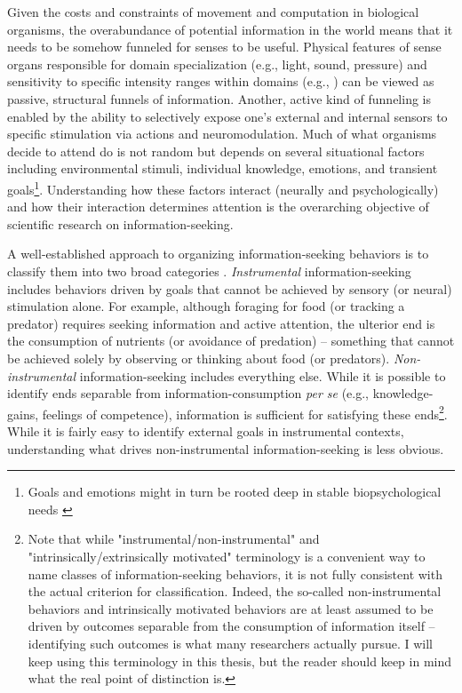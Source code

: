 Given the costs and constraints of movement and computation in biological organisms, the overabundance of potential information in the world means that it needs to be somehow funneled \cite{gottlieb_towards_2018} for senses to be useful. Physical features of sense organs responsible for domain specialization (e.g., light, sound, pressure) and sensitivity to specific intensity ranges within domains (e.g., \cite{schwab_evolution_2018}) can be viewed as passive, structural funnels of information. Another, active kind of funneling is enabled by the ability to selectively expose one's external and internal sensors to specific stimulation via actions and neuromodulation. Much of what organisms decide to attend do is not random but depends on several situational factors including environmental stimuli, individual knowledge, emotions, and transient goals\footnote{Goals and emotions might in turn be rooted deep in stable biopsychological needs \cite{ryan2017self}}. Understanding how these factors interact (neurally and psychologically) and how their interaction determines attention is the overarching objective of scientific research on information-seeking.

A well-established approach to organizing information-seeking behaviors is to classify them into two broad categories \cite{gottlieb_information-seeking_2013,gottlieb_towards_2018}. \emph{Instrumental} information-seeking includes behaviors driven by goals that cannot be achieved by sensory (or neural) stimulation alone. For example, although foraging for food (or tracking a predator) requires seeking information and active attention, the ulterior end is the consumption of nutrients (or avoidance of predation) -- something that cannot be achieved solely by observing or thinking about food (or predators). \emph{Non-instrumental} information-seeking includes everything else. While it is possible to identify ends separable from information-consumption \emph{per se} (e.g., knowledge-gains, feelings of competence), information is sufficient for satisfying these ends\footnote{Note that while "instrumental/non-instrumental" and "intrinsically/extrinsically motivated" terminology is a convenient way to name classes of information-seeking behaviors, it is not fully consistent with the actual criterion for classification. Indeed, the so-called non-instrumental behaviors and intrinsically motivated behaviors are at least assumed to be driven by outcomes separable from the consumption of information itself -- identifying such outcomes is what many researchers actually pursue. I will keep using this terminology in this thesis, but the reader should keep in mind what the real point of distinction is.}. While it is fairly easy to identify external goals in instrumental contexts, understanding what drives non-instrumental information-seeking is less obvious.


